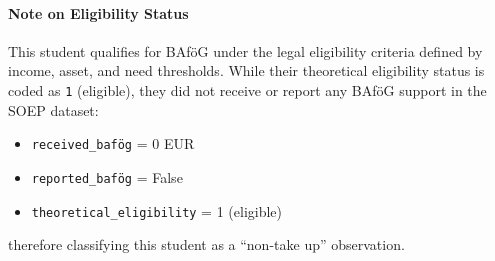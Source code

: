 \paragraph{Note on Eligibility Status}
This student qualifies for BAföG under the legal eligibility criteria defined by income, asset, and need thresholds. 
While their theoretical eligibility status is coded as \texttt{1} (eligible), they did not receive or report any BAföG support in the SOEP dataset:

\begin{itemize}
    \item \texttt{received\_bafög} = 0 EUR
    \item \texttt{reported\_bafög} = False
    \item \texttt{theoretical\_eligibility} = 1 (eligible)
\end{itemize}
therefore classifying this student as a ``non-take up'' observation.
